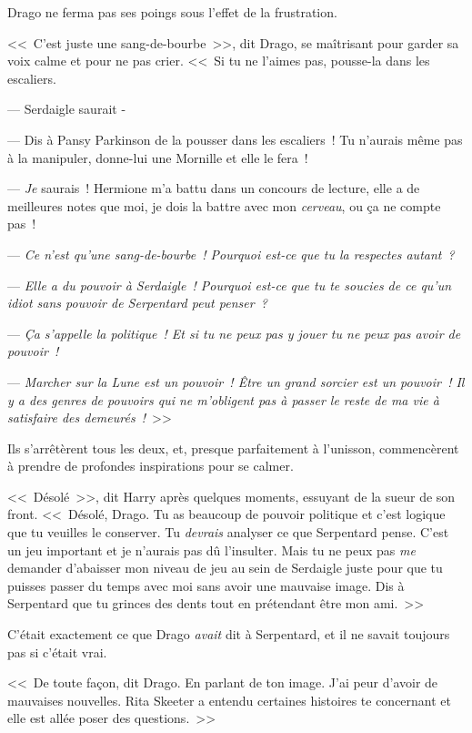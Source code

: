 Drago ne ferma pas ses poings sous l'effet de la frustration.

<<~C'est juste une sang-de-bourbe~>>, dit Drago, se maîtrisant pour garder sa voix calme et pour ne pas crier. <<~Si tu ne l'aimes pas, pousse-la dans les escaliers.

--- Serdaigle saurait -

--- Dis à Pansy Parkinson de la pousser dans les escaliers~! Tu n'aurais même pas à la manipuler, donne-lui une Mornille et elle le fera~!

--- \emph{Je} saurais~! Hermione m'a battu dans un concours de lecture, elle a de meilleures notes que moi, je dois la battre avec mon \emph{cerveau}, ou ça ne compte pas~!

--- \emph{Ce n'est qu'une sang-de-bourbe~! Pourquoi est-ce que tu la respectes autant~?}

--- \emph{Elle a du pouvoir à Serdaigle~! Pourquoi est-ce que tu te soucies de ce qu'un idiot sans pouvoir de Serpentard peut penser~?}

--- \emph{Ça s'appelle la politique~! Et si tu ne peux pas y jouer tu ne peux pas avoir de pouvoir~!}

--- \emph{Marcher sur la Lune est un pouvoir~! Être un grand sorcier est un pouvoir~! Il y a des genres de pouvoirs qui ne m'obligent pas à passer le reste de ma vie à satisfaire des demeurés~!}~>>

Ils s'arrêtèrent tous les deux, et, presque parfaitement à l'unisson, commencèrent à prendre de profondes inspirations pour se calmer.

<<~Désolé~>>, dit Harry après quelques moments, essuyant de la sueur de son front. <<~Désolé, Drago. Tu as beaucoup de pouvoir politique et c'est logique que tu veuilles le conserver. Tu \emph{devrais} analyser ce que Serpentard pense. C'est un jeu important et je n'aurais pas dû l'insulter. Mais tu ne peux pas \emph{me} demander d'abaisser mon niveau de jeu au sein de Serdaigle juste pour que tu puisses passer du temps avec moi sans avoir une mauvaise image. Dis à Serpentard que tu grinces des dents tout en prétendant être mon ami.~>>

C'était exactement ce que Drago \emph{avait} dit à Serpentard, et il ne savait toujours pas si c'était vrai.

<<~De toute façon, dit Drago. En parlant de ton image. J'ai peur d'avoir de mauvaises nouvelles. Rita Skeeter a entendu certaines histoires te concernant et elle est allée poser des questions.~>>

